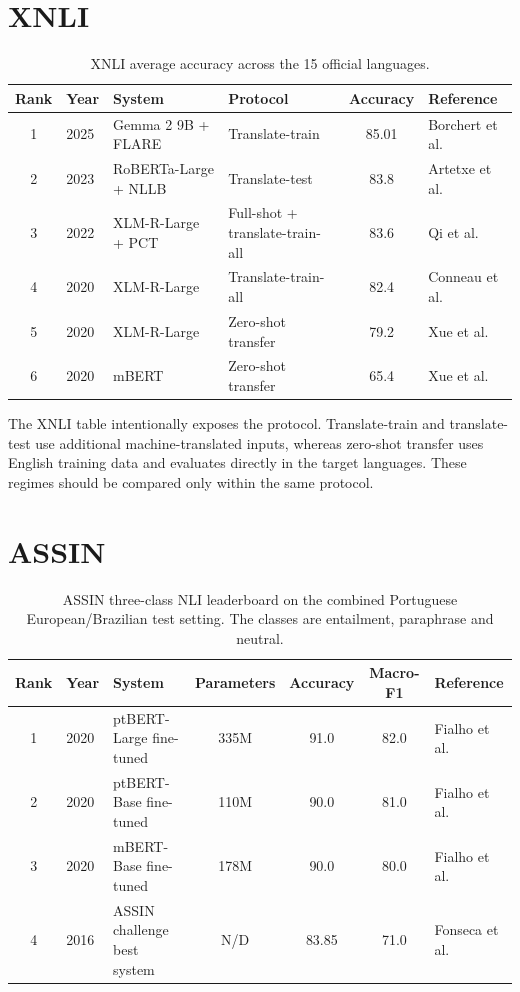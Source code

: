 \documentclass[10pt]{article}
\begin{document}
\section*{XNLI}
\begin{longtable}{@{}c p{3.1cm} p{2.9cm} p{2.7cm} c p{3.5cm}@{}}
\caption{XNLI average accuracy across the 15 official languages.}
\label{tab:xnli-literature}\\
\toprule
\textbf{Rank} & \textbf{Year} & \textbf{System} & \textbf{Protocol} & \textbf{Accuracy} & \textbf{Reference} \\
\midrule
1 & 2025 & Gemma 2 9B + FLARE & Translate-train & 85.01 & Borchert et al. \cite{borchert2025flare} \\
2 & 2023 & RoBERTa-Large + NLLB & Translate-test & 83.8 & Artetxe et al. \cite{artetxe2023mt} \\
3 & 2022 & XLM-R-Large + PCT & Full-shot + translate-train-all & 83.6 & Qi et al. \cite{qi2022pct} \\
4 & 2020 & XLM-R-Large & Translate-train-all & 82.4 & Conneau et al. \cite{conneau2020xlmr} \\
5 & 2020 & XLM-R-Large & Zero-shot transfer & 79.2 & Xue et al. \cite{xue2021mt5} \\
6 & 2020 & mBERT & Zero-shot transfer & 65.4 & Xue et al. \cite{xue2021mt5} \\
\bottomrule
\end{longtable}

The XNLI table intentionally exposes the protocol. Translate-train and
translate-test use additional machine-translated inputs, whereas zero-shot
transfer uses English training data and evaluates directly in the target
languages. These regimes should be compared only within the same protocol.

\section*{ASSIN}
\begin{longtable}{@{}c p{3.2cm} p{3.4cm} c c c p{3.2cm}@{}}
\caption{ASSIN three-class NLI leaderboard on the combined Portuguese
European/Brazilian test setting. The classes are entailment, paraphrase and
neutral.}
\label{tab:assin-literature}\\
\toprule
\textbf{Rank} & \textbf{Year} & \textbf{System} & \textbf{Parameters} & \textbf{Accuracy} & \textbf{Macro-F1} & \textbf{Reference} \\
\midrule
1 & 2020 & ptBERT-Large fine-tuned & 335M & 91.0 & 82.0 & Fialho et al. \cite{fialho2020} \\
2 & 2020 & ptBERT-Base fine-tuned & 110M & 90.0 & 81.0 & Fialho et al. \cite{fialho2020} \\
3 & 2020 & mBERT-Base fine-tuned & 178M & 90.0 & 80.0 & Fialho et al. \cite{fialho2020} \\
4 & 2016 & ASSIN challenge best system & N/D & 83.85 & 71.0 & Fonseca et al. \cite{fonseca2016assin} \\
\bottomrule
\end{longtable}
\end{document}
